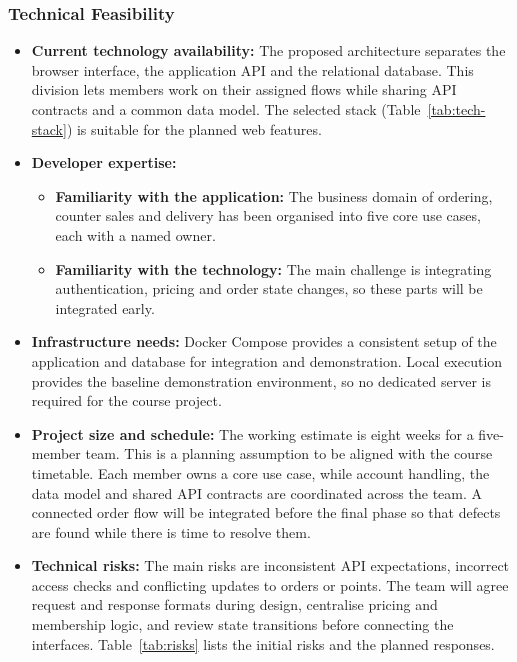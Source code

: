\subsubsection{Technical Feasibility}

\begin{itemize}
  \item \textbf{Current technology availability:} The proposed architecture separates the browser interface, the application API and the relational database. This division lets members work on their assigned flows while sharing API contracts and a common data model. The selected stack (Table~\ref{tab:tech-stack}) is suitable for the planned web features.
  \item \textbf{Developer expertise:}
  \begin{itemize}
    \item \textbf{Familiarity with the application:} The business domain of ordering, counter sales and delivery has been organised into five core use cases, each with a named owner.
    \item \textbf{Familiarity with the technology:} The main challenge is integrating authentication, pricing and order state changes, so these parts will be integrated early.
  \end{itemize}
  \item \textbf{Infrastructure needs:} Docker Compose provides a consistent setup of the application and database for integration and demonstration. Local execution provides the baseline demonstration environment, so no dedicated server is required for the course project.
  \item \textbf{Project size and schedule:} The working estimate is eight weeks for a five-member team. This is a planning assumption to be aligned with the course timetable. Each member owns a core use case, while account handling, the data model and shared API contracts are coordinated across the team. A connected order flow will be integrated before the final phase so that defects are found while there is time to resolve them.
  \item \textbf{Technical risks:} The main risks are inconsistent API expectations, incorrect access checks and conflicting updates to orders or points. The team will agree request and response formats during design, centralise pricing and membership logic, and review state transitions before connecting the interfaces. Table~\ref{tab:risks} lists the initial risks and the planned responses.
\end{itemize}

